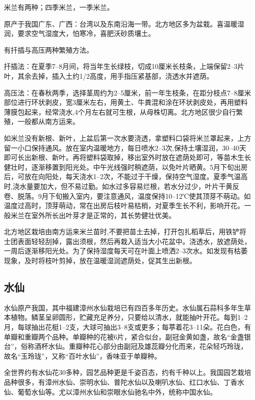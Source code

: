 \documentclass{ctexbook}
\begin{document}
米兰有两种；四季米兰，一季米兰。

原产于我国广东、广西：台湾以及东南沿海一带。北方地区多为盆栽。喜温暖湿润，要求空气湿度大，怕寒冷，喜肥沃砂质壤土。

有扦插与高压两种繁殖方法。

扦插法：在夏季7--8月间，将当年生长绿枝，切成10厘米长枝条，上端保留2--3片叶，其余去掉，插入土约1/2高度，用手指压紧基部，浇透水并遮荫。

高压法：在春秋两季，选择茎周约为2--5厘米，前一年生枝条，在距分枝点7--8厘米部位进行环状剥皮，宽3厘米左右，用黄土、牛粪混和涂在环状剥皮处，再用塑料薄膜包起来，经常浇水,4个月左右就可生根，从母株切离。北方地区很少自行繁殖，一般都从南方运来。

如米兰没有新根、新叶，上盆后第一次水要浇透，拿塑料口袋将米兰罩起来，上方留一小口保持通风。放在室内温暖地方，每日喷水2--3次,保持土壤湿润，30--40天即可长出新根、新叶。再将塑料袋取掉，移出室外时放在遮荫处即可，等苗木生长健壮时，逐渐移置到阳光处。中午光线强时稍遮荫，以免叶片晒黄。5月下旬出房后，可放在向阳处，每天浇水1--2次，不能过于干燥，保持空气湿度。夏季气温高时,浇水量要加大，但不易过勤。如水过多容易烂根，若水分过少，叶片干黄反卷、脱落。9月下旬搬入室内，要注意通风，温度保持10--12℃使其顶芽不萌动。如温度过高时，顶芽萌动，常在出房后枝叶易枯梢，对夏季生长不利，影响开花。一般米兰在室外所长出叶芽才是正常的，其长势健壮优美。

北方地区栽培由南方运来米兰苗时,不要把苗土去掉，打开包扎稻草后，用铁铲将士团表面轻轻刮掉，露出须根，然后再栽入适当大小花盆中。浇透水，放遮荫处，一周后逐渐移阳光处。为了保持湿度每天可在叶面上喷洒2--3次水。如发现有枯萎现象，及时将枝叶剪掉，放在温暖湿润遮荫处，促其生出新根。

\subsection{水仙}
水仙原产我国，其中福建漳州水仙栽培已有四百多年历史。水仙属石蒜科多年生草本植物。鳞茎呈卵圆形，贮藏充足养分，只要给以清水，就能抽叶开花。每到1--2月，每球抽出花梃1--2支，大球可抽出3--8支或更多；每葶着花3--11朵。花白色，有单瓣和重瓣两个品种。单瓣种的花被6片，紧合似台，副冠金黄如盏，故名“金盏银台”，俗称酒杯水仙。重瓣种花心部分由副冠及雄蕊瓣分化而来，花朵轻巧玲珑，故名“玉玲珑”，又称“百叶水仙”，香味亚于单瓣种。

全世界约有水仙花30多种，园艺品种更是千姿百态，约有千种以上。我国园艺栽培品种很多，有漳州水仙、崇明水仙、普陀水仙以及喇叭水仙、红口水仙、丁香水仙、葡萄水仙等。尤以漳州水仙和崇眼水仙驰名中外，统称中国水仙。
\end{document}
